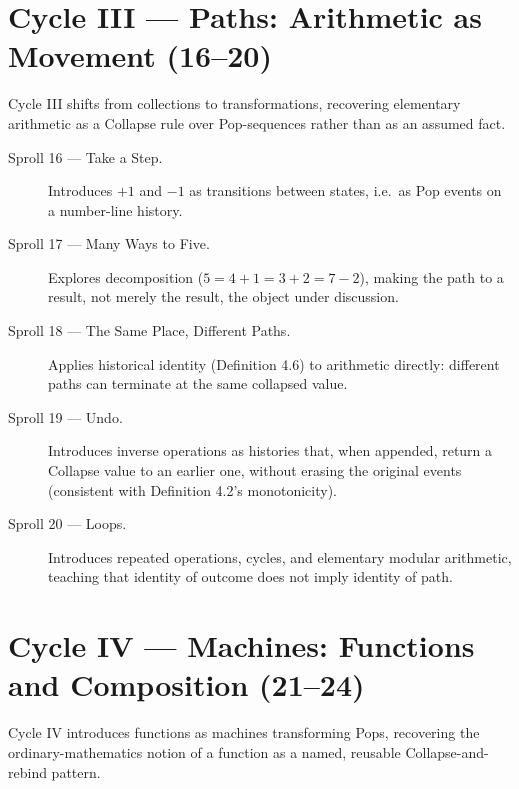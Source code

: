 \documentclass[11pt,twoside]{book}
\begin{document}
\chapter{Cycle III --- Paths: Arithmetic as Movement (16--20)}

Cycle III shifts from collections to transformations, recovering elementary arithmetic as a Collapse rule over Pop-sequences rather than as an assumed fact.

\begin{description}
\item[Sproll 16 --- Take a Step.] Introduces $+1$ and $-1$ as transitions between states, i.e.\ as Pop events on a number-line history.
\item[Sproll 17 --- Many Ways to Five.] Explores decomposition ($5 = 4+1 = 3+2 = 7-2$), making the path to a result, not merely the result, the object under discussion.
\item[Sproll 18 --- The Same Place, Different Paths.] Applies historical identity (Definition 4.6) to arithmetic directly: different paths can terminate at the same collapsed value.
\item[Sproll 19 --- Undo.] Introduces inverse operations as histories that, when appended, return a Collapse value to an earlier one, without erasing the original events (consistent with Definition 4.2's monotonicity).
\item[Sproll 20 --- Loops.] Introduces repeated operations, cycles, and elementary modular arithmetic, teaching that identity of outcome does not imply identity of path.
\end{description}

\chapter{Cycle IV --- Machines: Functions and Composition (21--24)}

Cycle IV introduces functions as machines transforming Pops, recovering the ordinary-mathematics notion of a function as a named, reusable Collapse-and-rebind pattern.
\end{document}

